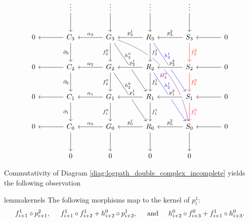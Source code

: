 \documentclass[a4paper,UKenglish,cleveref,nolineno,autoref]{socg-lipics-v2021}
\begin{document}
\vspace{-12pt}
\begin{equation} \label{diag:logpath_double_complex}
\begin{tikzcd} [column sep=large,row sep=large]
& \vdots \arrow[d] & \vdots \arrow[d] & \vdots \arrow[d] & \vdots \arrow[d] \\
0 & C_3 \arrow[l] \arrow[d,swap,"\partial_3"] & G_3 \arrow[l,swap,"\alpha_3"] \arrow[d,swap,"f_3^0"] \arrow[ddr,"h_3^0"{xshift=-10pt,yshift=10pt}] \arrow[dddrr,violet,bend left,"H_3^0"{xshift=-10pt,yshift=-14pt}] & R_3 \arrow[l,swap,"p_3^1"] \arrow[d,crossing over,"f_3^1"] \arrow[ddr,blue,"h_3^1"{xshift=-10pt,yshift=10pt}] & S_3 \arrow[l,swap,"p^2_3"] \arrow[d,red,"f_3^2"] & 0 \arrow[l] \\
0 & C_2 \arrow[l] \arrow[d,swap,"\partial_2"] & G_2 \arrow[l,swap,"\alpha_2"] \arrow[d,swap,"f_2^0"] \arrow[ddr,"h_2^0"{xshift=-10pt,yshift=10pt}] & R_2 \arrow[l,swap,"p_2^1"{xshift=3pt},crossing over] \arrow[d,"f_2^1"] \arrow[ddr,blue,"h_2^1"{xshift=-10pt,yshift=10pt}] & S_2 \arrow[l,swap,"p^2_2"{xshift=3pt},crossing over] \arrow[d,red,"f_2^2"] & 0 \arrow[l] \\
0 & C_1 \arrow[l] \arrow[d,swap,"\partial_1"] & G_1 \arrow[l,swap,"\alpha_1"] \arrow[d,swap,"f_1^0"] & R_1 \arrow[l,swap,"p_1^1"{xshift=3pt},crossing over] \arrow[d,"f_1^1"] & S_1 \arrow[l,swap,"p^2_1"{xshift=3pt},crossing over] \arrow[d,red,"f_1^2"] & 0 \arrow[l] \\
0 & C_0 \arrow[l] \arrow[d] & G_0 \arrow[l,swap,"\alpha_0"] \arrow[d] & R_0 \arrow[l,swap,"p_0^1"] \arrow[d] & S_0 \arrow[l,swap,"p^2_0"] \arrow [d]& 0 \arrow[l] \\
& 0 & 0 & 0 & 0
\end{tikzcd}
\end{equation} 


Commutativity of Diagram \eqref{diag:logpath_double_complex_incomplete} yields the following observation

\begin{restatable}{lemma}{kernels}
 \label{lem:kernels}
The following morphisms map to the kernel of $p^1_{i}$:
\begin{equation}
    \label{eq:logpath_morphisms}
f^1_{i+1}\circ p^2_{i+1} , \hspace{0.5cm} f^1_{i+1}\circ f^1_{i+2} + h^0_{i+2}\circ p^1_{i+2} ,  \hspace{0.5cm} \text{and} \hspace{0.5cm} h^0_{i+2}\circ f^0_{i+3} + f^1_{i+1} \circ h^0_{i+3} .
\end{equation}   
\end{restatable}
\end{document}
